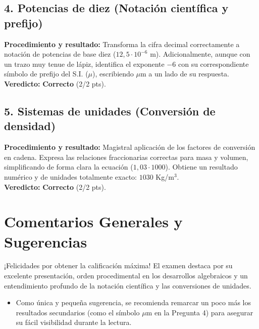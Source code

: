\documentclass[12pt]{article}
\begin{document}
\subsection*{4. Potencias de diez (Notación científica y prefijo)}
\textbf{Procedimiento y resultado:} Transforma la cifra decimal correctamente a notación de potencias de base diez ($12,5 \cdot 10^{-6}$ m). Adicionalmente, aunque con un trazo muy tenue de lápiz, identifica el exponente $-6$ con su correspondiente símbolo de prefijo del S.I. ($\mu$), escribiendo $\mu$m a un lado de su respuesta. \\
\textbf{Veredicto:} \textbf{Correcto} (2/2 pts).

\subsection*{5. Sistemas de unidades (Conversión de densidad)}
\textbf{Procedimiento y resultado:} Magistral aplicación de los factores de conversión en cadena. Expresa las relaciones fraccionarias correctas para masa y volumen, simplificando de forma clara la ecuación ($1,03 \cdot 1000$). Obtiene un resultado numérico y de unidades totalmente exacto: $1030$ Kg/m$^3$. \\
\textbf{Veredicto:} \textbf{Correcto} (2/2 pts).

\vspace{0.5cm}
\section*{Comentarios Generales y Sugerencias}
¡Felicidades por obtener la calificación máxima! El examen destaca por su excelente presentación, orden procedimental en los desarrollos algebraicos y un entendimiento profundo de la notación científica y las conversiones de unidades.
\begin{itemize}
    \item Como única y pequeña sugerencia, se recomienda remarcar un poco más los resultados secundarios (como el símbolo $\mu$m en la Pregunta 4) para asegurar su fácil visibilidad durante la lectura.
\end{itemize}
\end{document}
